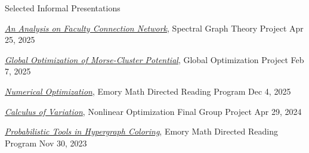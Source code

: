 \documentclass[10pt, letterpaper]{resume} %
\begin{document}
\begin{rSection}{Selected Informal Presentations}  
\begin{rSubsection}{}{}{}{}
\item \href{https://www.dropbox.com/scl/fi/cau0hc4erhg0amyyfme8o/Spectral_Graph_Theory_Jiuru_Lyu.pdf?rlkey=mbcigxfeqv8e4vlk3cn97zrvn&st=5hlxdzf8&dl=0}{\textit{An Analysis on Faculty Connection Network}}, Spectral Graph Theory Project \hfill Apr 25, 2025
\item \href{https://www.dropbox.com/scl/fi/tvpx670nijy8lwamxlvnd/Global_Optimization_Jiuru_Lyu.pdf?rlkey=hxpo4xxkzwubmb2lestimqs8k&st=66eovify&dl=0}{\textit{Global Optimization of Morse-Cluster Potential}}, Global Optimization Project \hfill Feb 7, 2025 
\item \href{https://www.dropbox.com/scl/fi/czpae3nk0h61b4mmwbiid/MATH498R_Presentation_Fall24_Jiuru-Lyu.pdf?rlkey=rrvxbr4u8ekfmjep7r5rd99uh&st=mttmtbxy&dl=0}{\textit{Numerical Optimization}}, Emory Math Directed Reading Program \hfill Dec 4, 2025
\item \href{https://www.dropbox.com/scl/fi/gsxbufy0xojg319tvfjgl/MATH347_Final_Presentation_Jiuru_Lyu.pdf?rlkey=uljq7nr93m7eybdo8relga1cb&st=3u9r1x3e&dl=0}{\textit{Calculus of Variation}}, Nonlinear Optimization Final Group Project \hfill Apr 29, 2024
\item \href{https://www.dropbox.com/scl/fi/8x3j4utuucjsocsw0pyhh/MATH498R_Presentation_Fall23_Jiuru_Lyu.pdf?rlkey=fav70ky3k878qf8gy6tnypd8w&st=ggxgey5l&dl=0}{\textit{Probabilistic Tools in Hypergraph Coloring}}, Emory Math Directed Reading Program \hfill Nov 30, 2023
\end{rSubsection}
\end{rSection}
  
\label{LastPage}
\end{document}
